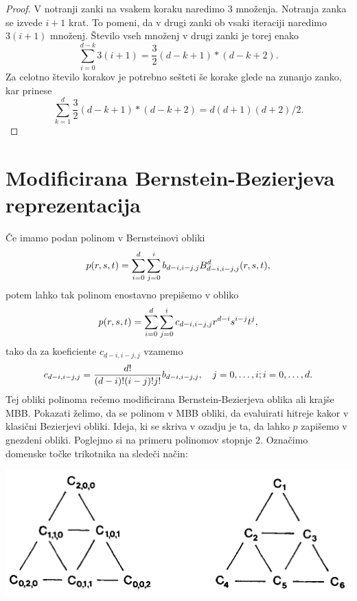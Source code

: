 \documentclass{article}
\begin{document}
\begin{proof}
V notranji zanki na vsakem koraku naredimo $3$ množenja. Notranja zanka se izvede $i+1$ krat. To pomeni, da v drugi zanki ob vsaki iteraciji naredimo $3(i+1)$ množenj. Število vseh množenj v drugi zanki je torej enako
$$\sum_{i=0}^{d-k}3(i+1) = \frac{3}{2}(d-k+1)*(d-k+2).$$
Za celotno število korakov je potrebno sešteti še korake glede na zunanjo zanko, kar prinese 
$$\sum_{k=1}^{d}\frac{3}{2}(d-k+1)*(d-k+2) = d(d+1)(d+2)/2.$$
\end{proof}



\section{Modificirana Bernstein-Bezierjeva reprezentacija}

Če imamo podan polinom v Bernsteinovi obliki $$p(r,\\s,\\t) = \sum_{i=0}^{d}\sum_{j=0}^{i}b_{d-i,i-j,j}B_{d-i,i-j,j}^d(r,\\s,\\t),$$
potem lahko tak polinom enostavno prepišemo v obliko
$$p(r,\\s,\\t) = \sum_{i=0}^{d}\sum_{j=0}^{i}c_{d-i,i-j,j}r^{d-i}s^{i-j}t^j,$$
tako da za koeficiente $c_{d-i,i-j,j}$ vzamemo
$$c_{d-i,i-j,j} = \frac{d!}{(d-i)!(i-j)!j!}b_{d-i,i-j,j}, \quad j=0,\ldots, i;\\ i = 0,\ldots,d.$$
Tej obliki polinoma rečemo modificirana Bernstein-Bezierjeva oblika ali krajše MBB. Pokazati želimo, da se polinom v MBB obliki, da evaluirati hitreje kakor v klasični Bezierjevi obliki. Ideja, ki se skriva v ozadju je ta, da lahko $p$ zapišemo v gnezdeni obliki. Poglejmo si na primeru polinomov stopnje $2$. Označimo domenske točke trikotnika na sledeči način:

\begin{center}
\includegraphics[width=.9\linewidth]{graf.png}
\end{center}
\end{document}

